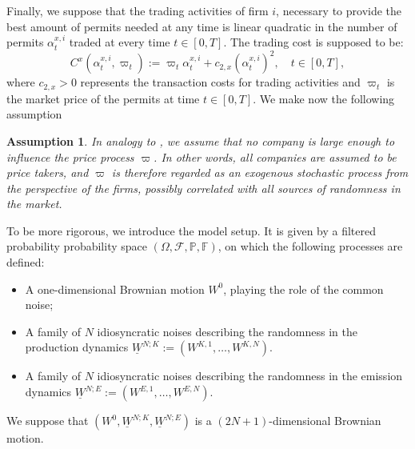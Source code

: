 \documentclass[10pt,a4paper]{amsart}
\newtheorem{assumption}[theorem]{Assumption}
\numberwithin{equation}{section}
\newcommand{\w}{\varpi}
\newcommand{\F}{\mathbb{F}}
\newcommand{\ItF}{\mathcal{F}}
\newcommand{\prob}{\mathbb{P}}
\begin{document}
Finally, we suppose that the trading activities of firm $i$, necessary to provide the best amount of permits needed at any time is linear quadratic in the number of permits $\alpha^{x,i}_t$ traded at every time $t\in[0,T]$. The trading cost is supposed to be: 
\begin{equation}
\label{eqn: quadratic cost functional}
C^x(\alpha^{x,i}_t,\w_t) := \w_t \alpha^{x,i}_t + c_{2,x} (\alpha^{x,i}_t)^2,\quad t\in[0,T],
\end{equation}
where $c_{2,x}>0$ represents the transaction costs for trading activities and $\w_t$ is the market price of the permits at time $t\in[0,T]$. We make now the following assumption
\begin{assumption}
\label{ass: price taker companies}
In analogy to \cite{del2024mean}, we assume that no company is large enough to influence the price process $\w$. In other words, all companies are assumed to be \emph{price takers}, and $\w$ is therefore regarded as an exogenous stochastic process from the perspective of the firms, possibly correlated with all sources of randomness in the market.
\end{assumption}
To be more rigorous, we introduce the model setup. It is given by a filtered probability probability space $(\Omega,\ItF,\prob,\F)$, on which the following processes are defined:
\begin{itemize}
\item A one-dimensional Brownian motion $W^0$, playing the role of the common noise;
\item A family of $N$ idiosyncratic noises describing the randomness in the production dynamics $\underline{W}^{N;K} := (W^{K,1},\dots ,W^{K,N})$.
\item A family of $N$ idiosyncratic noises describing the randomness in the emission dynamics $\underline{W}^{N;E} := (W^{E,1},\dots ,W^{E,N})$.
\end{itemize}
We suppose that $(W^0,\underline{W}^{N;K},\underline{W}^{N;E})$ is a $(2N+1)$-dimensional Brownian motion.
\end{document}
